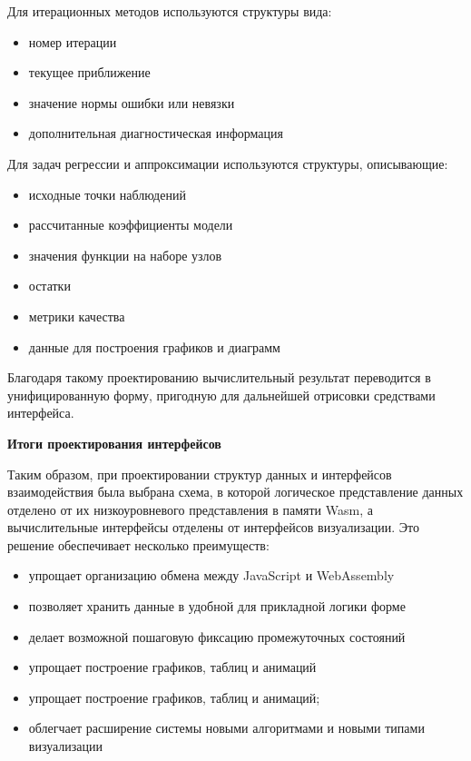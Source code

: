\documentclass[12pt, oneside]{book}
\begin{document}
    \quad Для итерационных методов используются структуры вида:

    \begin{itemize}
        \item номер итерации
        \item текущее приближение
        \item значение нормы ошибки или невязки
        \item дополнительная диагностическая информация
    \end{itemize}


    \quad Для задач регрессии и аппроксимации используются структуры, описывающие:

    \begin{itemize}
        \item исходные точки наблюдений
        \item рассчитанные коэффициенты модели
        \item значения функции на наборе узлов
        \item остатки
        \item метрики качества
        \item данные для построения графиков и диаграмм
    \end{itemize}
    

    \quad Благодаря такому проектированию вычислительный результат переводится в унифицированную форму, пригодную для дальнейшей отрисовки средствами интерфейса.

    \vspace{0.5em}

    \textbf{\large Итоги проектирования интерфейсов}

    \vspace{0.5em}
        
        
    \quad Таким образом, при проектировании структур данных и интерфейсов взаимодействия была выбрана схема, в которой логическое представление данных отделено от их низкоуровневого представления в памяти Wasm, а вычислительные интерфейсы отделены от интерфейсов визуализации. Это решение обеспечивает несколько преимуществ:

    \begin{itemize}
        \item упрощает организацию обмена между JavaScript и WebAssembly
        \item позволяет хранить данные в удобной для прикладной логики форме
        \item делает возможной пошаговую фиксацию промежуточных состояний
        \item упрощает построение графиков, таблиц и анимаций
        \item упрощает построение графиков, таблиц и анимаций;
        \item облегчает расширение системы новыми алгоритмами и новыми типами визуализации
    \end{itemize}
\end{document}
